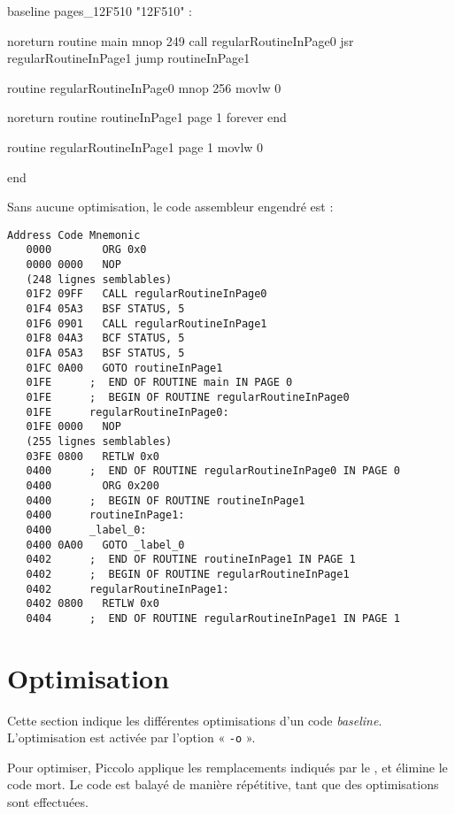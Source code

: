 \begin{piccolo}
baseline pages_12F510 "12F510" :

noreturn routine main {
  mnop 249
  call regularRoutineInPage0
  jsr  regularRoutineInPage1
  jump routineInPage1
}

routine regularRoutineInPage0 {
  mnop 256
  movlw 0
}

noreturn routine routineInPage1 page 1 {
  forever
  end
}

routine regularRoutineInPage1 page 1 {
  movlw 0
}

end
\end{piccolo}

Sans aucune optimisation, le code assembleur engendré est :

\begin{lstlisting}[language=assembleur]
Address Code Mnemonic
   0000        ORG 0x0
   0000 0000   NOP
   (248 lignes semblables)
   01F2 09FF   CALL regularRoutineInPage0
   01F4 05A3   BSF STATUS, 5
   01F6 0901   CALL regularRoutineInPage1
   01F8 04A3   BCF STATUS, 5
   01FA 05A3   BSF STATUS, 5
   01FC 0A00   GOTO routineInPage1
   01FE      ;  END OF ROUTINE main IN PAGE 0
   01FE      ;  BEGIN OF ROUTINE regularRoutineInPage0
   01FE      regularRoutineInPage0:
   01FE 0000   NOP
   (255 lignes semblables)
   03FE 0800   RETLW 0x0
   0400      ;  END OF ROUTINE regularRoutineInPage0 IN PAGE 0
   0400        ORG 0x200
   0400      ;  BEGIN OF ROUTINE routineInPage1
   0400      routineInPage1:
   0400      _label_0:
   0400 0A00   GOTO _label_0
   0402      ;  END OF ROUTINE routineInPage1 IN PAGE 1
   0402      ;  BEGIN OF ROUTINE regularRoutineInPage1
   0402      regularRoutineInPage1:
   0402 0800   RETLW 0x0
   0404      ;  END OF ROUTINE regularRoutineInPage1 IN PAGE 1
\end{lstlisting}








\section{Optimisation}

Cette section indique les différentes optimisations d'un code \emph{baseline}. L'optimisation est activée par l'option « \texttt{-o} ».

Pour optimiser, Piccolo applique les remplacements indiqués par le , et élimine le code mort. Le code est balayé de manière répétitive, tant que des optimisations sont effectuées.

